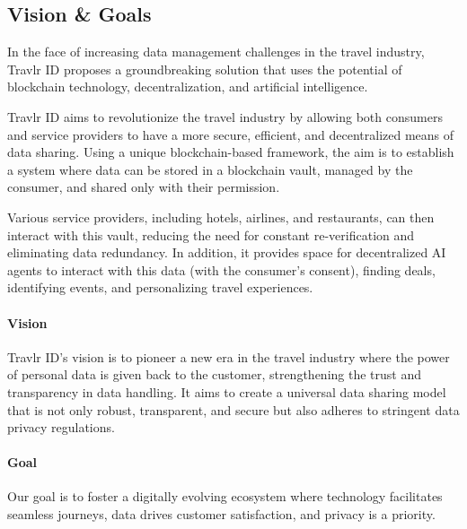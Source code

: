 \documentclass{article}
\begin{document}
\subsection{Vision \& Goals}

In the face of increasing data management challenges in the travel industry, Travlr ID proposes a groundbreaking solution that uses the potential of blockchain technology, decentralization, and artificial intelligence.

Travlr ID aims to revolutionize the travel industry by allowing both consumers and service providers to have a more secure, efficient, and decentralized means of data sharing. Using a unique blockchain-based framework, the aim is to establish a system where data can be stored in a blockchain vault, managed by the consumer, and shared only with their permission.

Various service providers, including hotels, airlines, and restaurants, can then interact with this vault, reducing the need for constant re-verification and eliminating data redundancy. In addition, it provides space for decentralized AI agents to interact with this data (with the consumer's consent), finding deals, identifying events, and personalizing travel experiences. 

\paragraph{Vision} Travlr ID's vision is to pioneer a new era in the travel industry where the power of personal data is given back to the customer, strengthening the trust and transparency in data handling. It aims to create a universal data sharing model that is not only robust, transparent, and secure but also adheres to stringent data privacy regulations. 

\paragraph{Goal} Our goal is to foster a digitally evolving ecosystem where technology facilitates seamless journeys, data drives customer satisfaction, and privacy is a priority.
\end{document}
